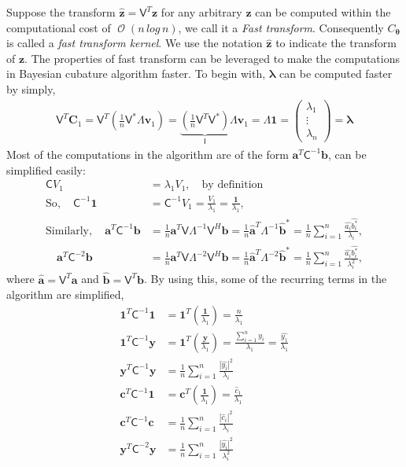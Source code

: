 \documentclass[twocolumn]{svjour3}          %
\DeclareMathOperator{\Order}{{\mathcal O}}
\newcommand{\bm}[1]{\boldsymbol{#1}}
\newcommand{\vlambda}{{\bm{\lambda}}}
\newcommand{\vtheta}{{\bm{\theta}}}
\newcommand{\va}{\bm{a}}
\newcommand{\vb}{\bm{b}}
\newcommand{\vc}{\bm{c}}
\newcommand{\vC}{\bm{C}}
\newcommand{\vv}{\bm{v}}
\newcommand{\vy}{\bm{y}}
\newcommand{\vz}{\bm{z}}
\newcommand{\vone}{\bm{1}}
\newcommand{\mC}{\mathsf{C}}
\newcommand{\mCInv}{{\mathsf{C}^{-1}}}
\newcommand{\mLambda}{\mathsf{\Lambda}}
\newcommand{\mLambdaInv}{\mathsf{\Lambda}^{-1}}
\newcommand{\mV}{\mathsf{V}}
\def\abs#1{\ensuremath{\left \lvert #1 \right \rvert}}
\begin{document}
Suppose the transform $\hat{\vz} = \mV^T \vz$ for any arbitrary $\vz$ can be computed within the computational cost of $\Order( n \, log\, n)$, we call it a \emph{Fast transform}. Consequently $C_{\vtheta}$ is called a \emph{fast transform kernel}.
We use the notation $\hat{\vz}$ to indicate the transform of $\vz$.
The properties of fast transform can be leveraged to make the computations in Bayesian cubature algorithm faster. To begin with, $\vlambda$ can be computed faster by simply,
\begin{align}
\label{eqn:fast_trasnform_to_eigvalues}
\mV^T \vC_1 = \mV^T \left( \frac 1n \mV^* \mLambda \vv_1 \right) =
\underbrace{\left( \frac 1n \mV^T  \mV^* \right) }_{\mathsf{I}} \mLambda \vv_1  =  \mLambda \vone =
\begin{pmatrix}
\lambda_1 \\ \vdots \\ \lambda_n
\end{pmatrix} = \vlambda
\end{align}
Most of the computations in the algorithm are of the form $\va^T\mCInv\vb$, can be simplified easily:
\begin{align*}
\mC V_1 &= \lambda_1 V_1 , \quad \text{by definition}
\\
\text{So}, \quad
\mCInv \vone &= \mCInv V_1 = \frac{V_1}{\lambda_1} = \frac{\vone}{\lambda_1} , 
\\
\text{Similarly}, \quad \va^T\mCInv\vb &= \frac 1n \va^T \mV \mLambdaInv \mV^H \vb
= \frac 1n \widehat{\va}^T\mLambdaInv \widehat{\vb}^*
= \frac 1n \sum_{i=1}^n \frac{\widehat{a_i} \widehat{b_i^*}}{\lambda_i},
\\
\quad \va^T\mC^{-2}\vb &= \frac 1n \va^T \mV \mLambda^{-2} \mV^H \vb
= \frac 1n \widehat{\va}^T\mLambda^{-2} \widehat{\vb}^*
= \frac 1n \sum_{i=1}^n \frac{\widehat{a_i} \widehat{b_i^*}}{\lambda_i^2},
\end{align*}
where $\widehat{\va} = \mV^T \va$ and $\widehat{\vb} = \mV^T \vb$. By using this, some of the recurring terms in the algorithm are simplified,
\begin{align*}
\vone^T\mCInv\vone &= \vone^T \left(\frac{\vone}{\lambda_1}\right) = \frac{n}{\lambda_1}
\\
\vone^T\mCInv\vy &= \vone^T \left( \frac{\vy}{\lambda_1} \right) = \frac{\sum_{i=1}^n y_i}{\lambda_1} = \frac{\widehat{y_1}}{\lambda_1}
\\
\vy^T\mCInv \vy &= \frac 1n \sum_{i=1}^n \frac{\abs{\widehat{y_i}}^2}{\lambda_i}
\\
\vc^T\mCInv \vone &= \vc^T \left(\frac{ \vone }{\lambda_1} \right) = \frac{\widehat{c}_1}{\lambda_1}
\\
\vc^T\mCInv \vc &= \frac 1n \sum_{i=1}^n \frac{\abs{\widehat{c}_i}^2}{\lambda_i}
\\
\vy^T\mC^{-2} \vy &= \frac 1n \sum_{i=1}^n \frac{\abs{\widehat{y_i}}^2}{\lambda_i^2}
\end{align*}
\end{document}
